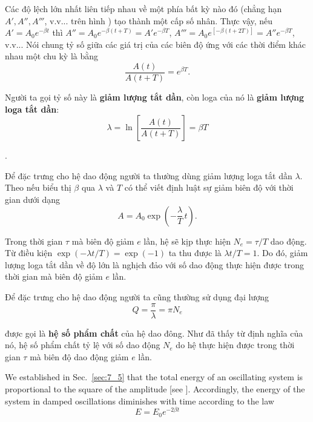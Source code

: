Các độ lệch lớn nhất liên tiếp nhau về một phía bất kỳ nào đó (chẳng hạn $A', A'', A'''$, v.v... trên hình ) tạo thành một cấp số nhân. Thực vậy, nếu $A'=A_0e^{-\beta t}$ thì $A''=A_0e^{-\beta(t+T)}=A'e^{-\beta T}$, $A'''=A_0e^{[-\beta(t+2T)]}=A''e^{-\beta T}$, v.v... Nói chung tỷ số giữa các giá trị của các biên độ ứng với các thời điểm khác nhau một chu kỳ là bằng
\begin{equation*}
	\frac{A(t)}{A(t+T)} = e^{\beta T}.
\end{equation*}

\noindent
Người ta gọi tỷ số này là \textbf{giảm lượng tắt dần}, còn loga của nó là  \textbf{giảm lượng loga tắt dần}:
\begin{equation}\label{eq:7_104}
	\lambda = \ln\left[\frac{A(t)}{A(t+T)}\right] = \beta T
\end{equation}

.

Để đặc trưng cho hệ dao động người ta thường dùng giảm lượng loga tắt dần $\lambda$. Theo  nếu biểu thị $\beta$ qua $\lambda$ và $T$ có thể viết định luật sự giảm biên độ với thời gian dưới dạng
\begin{equation}\label{eq:7_105}
	A = A_0\exp\left(-\frac{\lambda}{T}\,t\right).
\end{equation}

\noindent
Trong thời gian $\tau$ mà biên độ giảm $e$ lần, hệ sẽ kịp thực hiện $N_e=\tau/T$ dao động. Từ điều kiện $\exp(-\lambda t/T)=\exp(-1)$ ta thu được là $\lambda t/T=1$. Do đó, giảm lượng loga tắt dần về độ lớn là nghịch đảo với số dao động thực hiện được trong thời gian mà biên độ giảm $e$ lần.

Để đặc trưng cho hệ dao động người ta cũng thường sử dụng đại lượng
\begin{equation}\label{eq:7_106}
	Q = \frac{\pi}{\lambda} = \pi N_e
\end{equation}

\noindent
được gọi là \textbf{hệ số phẩm chất} của hệ dao đông. Như đã thấy từ định nghĩa của nó, hệ số phẩm chất tỷ lệ với số dao động $N_e$ do hệ thực hiện được trong thời gian $\tau$ mà biên độ dao động giảm $e$ lần.

We established in Sec.~\ref{sec:7_5} that the total energy of an oscillating system is proportional to the square of the amplitude [see ]. Accordingly, the energy of the system in damped oscillations diminishes with time according to the law
\begin{equation}\label{eq:7_107}
	E = E_0 e^{-2\beta t}
\end{equation}

